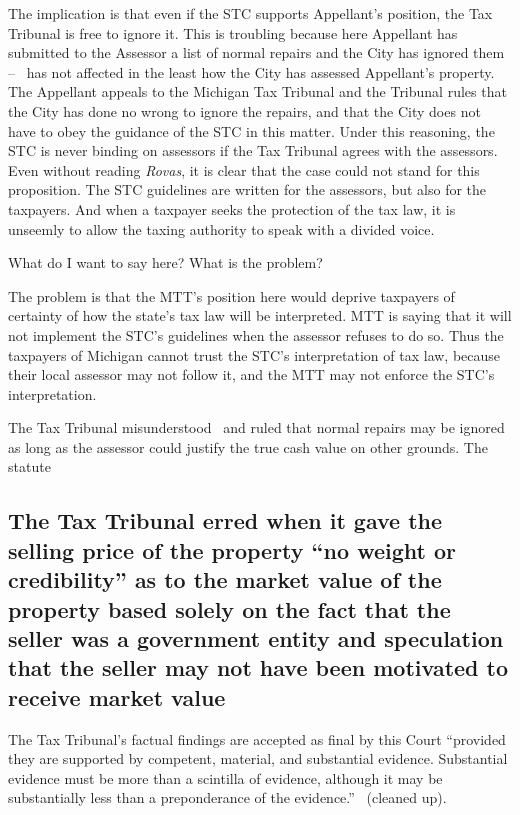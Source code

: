 \documentclass[12pt,\documentclassflag]{michiganCourtOfAppealsBrief}
\newcommand*\ruleline[1]{%
  \par\noindent%
  \raisebox{.8ex}{\makebox[\linewidth]{\hrulefill\hspace{1ex}%
      \raisebox{-.8ex}{#1}%
      \hspace{1ex}\hrulefill}}}%
\newenvironment{draft}{%
  \color{blue}%
  \ruleline{Begin Draft}
}{%
  \ruleline{End Draft}
  \color{black}%
}
\begin{document}
\begin{draft}
  The implication  is that even if the STC supports Appellant's position, the Tax Tribunal is free to ignore it. This is troubling because here Appellant has submitted to the Assessor a list of normal repairs and the City has ignored them -- \mathieuGast\ has not affected in the least how the City has assessed Appellant's property. The Appellant appeals to the Michigan Tax Tribunal and the Tribunal rules that the City has done no wrong to ignore the repairs, and that the City does not have to obey the guidance of the STC in this matter. Under this reasoning, the STC is never binding on assessors if the Tax Tribunal agrees with the assessors. Even without reading \textit{Rovas}, it is clear that the case could not stand for this proposition. The STC guidelines are written for the assessors, but also for the taxpayers. And when a taxpayer seeks the protection of the tax law, it is unseemly to allow the taxing authority to speak with a divided voice.

What do I want to say here? What is the problem?

The problem is that the MTT's position here would deprive taxpayers of certainty of how the state's tax law will be interpreted. MTT is saying that it will not implement the STC's guidelines when the assessor refuses to do so. Thus the taxpayers of Michigan cannot trust the STC's interpretation of tax law, because their local assessor may not follow it, and the MTT may not enforce the STC's interpretation.

The Tax Tribunal misunderstood \mathieuGast\ and ruled that normal repairs may be ignored as long as the assessor could justify the true cash value on other grounds. The statute

\end{draft}

\subsection{The Tax Tribunal erred when it gave the selling price of the property ``no weight or credibility'' as to the market value of the property based solely on the fact that the seller was a government entity and speculation that the seller may not have been motivated to receive market value}

The Tax Tribunal's factual findings are accepted as final by this Court ``provided they are supported by competent, material, and substantial evidence. Substantial evidence must be more than a scintilla of evidence, although it may be substantially less than a preponderance of the evidence.'' \ (cleaned up).
\end{document}
